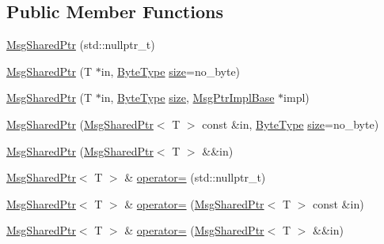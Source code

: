 \subsection*{Public Member Functions}
\begin{DoxyCompactItemize}
\item 
\hyperlink{structvt_1_1messaging_1_1_msg_shared_ptr_a560ea1c81555ee5ea06efaa86445ba1b}{Msg\+Shared\+Ptr} (std\+::nullptr\+\_\+t)
\item 
\hyperlink{structvt_1_1messaging_1_1_msg_shared_ptr_aceba59bb70858cbf4c5affc00968a6a1}{Msg\+Shared\+Ptr} (T $\ast$in, \hyperlink{namespacevt_aab8d55968084610ce3b17057981e9300}{Byte\+Type} \hyperlink{structvt_1_1messaging_1_1_msg_shared_ptr_a2ed79c214e294d8a15c930ee573f13b9}{size}=no\+\_\+byte)
\item 
\hyperlink{structvt_1_1messaging_1_1_msg_shared_ptr_afd1eeed56746b0a56aef23b5ba8cf31f}{Msg\+Shared\+Ptr} (T $\ast$in, \hyperlink{namespacevt_aab8d55968084610ce3b17057981e9300}{Byte\+Type} \hyperlink{structvt_1_1messaging_1_1_msg_shared_ptr_a2ed79c214e294d8a15c930ee573f13b9}{size}, \hyperlink{structvt_1_1messaging_1_1_msg_ptr_impl_base}{Msg\+Ptr\+Impl\+Base} $\ast$impl)
\item 
\hyperlink{structvt_1_1messaging_1_1_msg_shared_ptr_a19dac0c0fbac2b4ed069564445500de6}{Msg\+Shared\+Ptr} (\hyperlink{structvt_1_1messaging_1_1_msg_shared_ptr}{Msg\+Shared\+Ptr}$<$ T $>$ const \&in, \hyperlink{namespacevt_aab8d55968084610ce3b17057981e9300}{Byte\+Type} \hyperlink{structvt_1_1messaging_1_1_msg_shared_ptr_a2ed79c214e294d8a15c930ee573f13b9}{size}=no\+\_\+byte)
\item 
\hyperlink{structvt_1_1messaging_1_1_msg_shared_ptr_af08de8fd20fe431e551273451123b334}{Msg\+Shared\+Ptr} (\hyperlink{structvt_1_1messaging_1_1_msg_shared_ptr}{Msg\+Shared\+Ptr}$<$ T $>$ \&\&in)
\item 
\hyperlink{structvt_1_1messaging_1_1_msg_shared_ptr}{Msg\+Shared\+Ptr}$<$ T $>$ \& \hyperlink{structvt_1_1messaging_1_1_msg_shared_ptr_ac6f496608ceb2f96b9457b0082f76e28}{operator=} (std\+::nullptr\+\_\+t)
\item 
\hyperlink{structvt_1_1messaging_1_1_msg_shared_ptr}{Msg\+Shared\+Ptr}$<$ T $>$ \& \hyperlink{structvt_1_1messaging_1_1_msg_shared_ptr_af2b0f17fdd4601d00b75410699fa5738}{operator=} (\hyperlink{structvt_1_1messaging_1_1_msg_shared_ptr}{Msg\+Shared\+Ptr}$<$ T $>$ const \&in)
\item 
\hyperlink{structvt_1_1messaging_1_1_msg_shared_ptr}{Msg\+Shared\+Ptr}$<$ T $>$ \& \hyperlink{structvt_1_1messaging_1_1_msg_shared_ptr_ad6712e7dac73e70a61690e83122fda7c}{operator=} (\hyperlink{structvt_1_1messaging_1_1_msg_shared_ptr}{Msg\+Shared\+Ptr}$<$ T $>$ \&\&in)

\end{DoxyCompactItemize}

